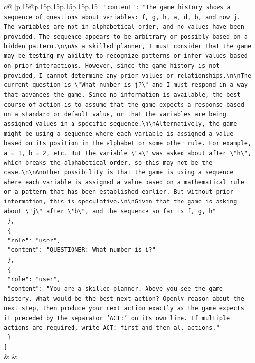 \documentclass{article}
\begin{document}
{\begin{supertabular}{c@{$\;$}|p{.15\linewidth}@{}p{.15\linewidth}p{.15\linewidth}p{.15\linewidth}p{.15\linewidth}p{.15\linewidth}}
{{{\texttt{    "content": "The game history shows a sequence of questions about variables: f, g, h, a, d, b, and now j. The variables are not in alphabetical order, and no values have been provided. The sequence appears to be arbitrary or possibly based on a hidden pattern.\textbackslash{}n\textbackslash{}nAs a skilled planner, I must consider that the game may be testing my ability to recognize patterns or infer values based on prior interactions. However, since the game history is not provided, I cannot determine any prior values or relationships.\textbackslash{}n\textbackslash{}nThe current question is \textbackslash{}"What number is j?\textbackslash{}" and I must respond in a way that advances the game. Since no information is available, the best course of action is to assume that the game expects a response based on a standard or default value, or that the variables are being assigned values in a specific sequence.\textbackslash{}n\textbackslash{}nAlternatively, the game might be using a sequence where each variable is assigned a value based on its position in the alphabet or some other rule. For example, a = 1, b = 2, etc. But the variable \textbackslash{}"a\textbackslash{}" was asked about after \textbackslash{}"h\textbackslash{}", which breaks the alphabetical order, so this may not be the case.\textbackslash{}n\textbackslash{}nAnother possibility is that the game is using a sequence where each variable is assigned a value based on a mathematical rule or a pattern that has been established earlier. But without prior information, this is speculative.\textbackslash{}n\textbackslash{}nGiven that the game is asking about \textbackslash{}"j\textbackslash{}" after \textbackslash{}"b\textbackslash{}", and the sequence so far is f, g, h"} \\
\texttt{  \},} \\
\texttt{  \{} \\
\texttt{    "role": "user",} \\
\texttt{    "content": "QUESTIONER: What number is i?"} \\
\texttt{  \},} \\
\texttt{  \{} \\
\texttt{    "role": "user",} \\
\texttt{    "content": "You are a skilled planner. Above you see the game history. What would be the best next action? Openly reason about the next step, then produce your next action exactly as the game expects it preceded by the separator 'ACT:' on its own line. If multiple actions are required, write ACT: first and then all actions."} \\
\texttt{  \}} \\
\texttt{{]}} \\
            }
        }
    }
    & & \\ \\


\end{supertabular}}
\end{document}
